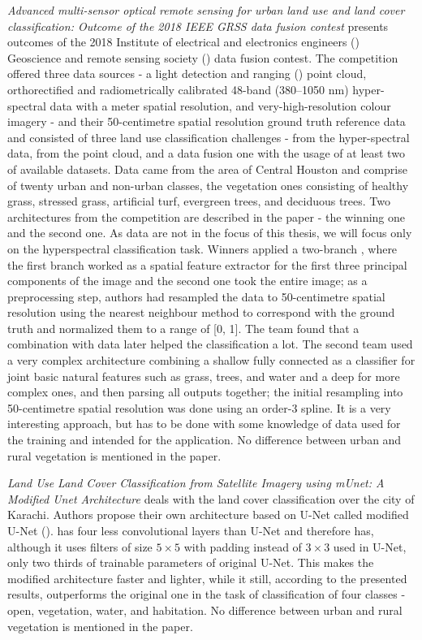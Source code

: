 \textit{Advanced multi-sensor optical remote sensing for urban land use and land cover classification: Outcome of the 2018 IEEE GRSS data fusion contest} presents outcomes of the 2018 Institute of electrical and electronics engineers () Geoscience and remote sensing society () data fusion contest. The competition offered three data sources - a light detection and ranging () point cloud, orthorectified and radiometrically calibrated 48-band (380--1050 nm) hyper-spectral data with a meter spatial resolution, and very-high-resolution colour imagery - and their 50-centimetre spatial resolution ground truth reference data and consisted of three land use classification challenges - from the hyper-spectral data, from the point cloud, and a data fusion one with the usage of at least two of available datasets. Data came from the area of Central Houston and comprise of twenty urban and non-urban classes, the vegetation ones consisting of healthy grass, stressed grass, artificial turf, evergreen trees, and deciduous trees. Two architectures from the competition are described in the paper - the winning one and the second one. As  data are not in the focus of this thesis, we will focus only on the hyperspectral classification task. Winners applied a two-branch , where the first branch worked as a spatial feature extractor for the first three principal components of the image and the second one took the entire image; as a preprocessing step, authors had resampled the data to 50-centimetre spatial resolution using the nearest neighbour method to correspond with the ground truth and normalized them to a range of [0, 1]. The team found that a combination with  data later helped the classification a lot. The second team used a very complex architecture combining a shallow fully connected  as a classifier for joint basic natural features such as grass, trees, and water and a deep  for more complex ones, and then parsing all outputs together; the initial resampling into 50-centimetre spatial resolution was done using an order-3 spline. It is a very interesting approach, but has to be done with some knowledge of data used for the training and intended for the application. No difference between urban and rural vegetation is mentioned in the paper.

\textit{Land Use Land Cover Classification from Satellite Imagery using mUnet: A Modified Unet Architecture} deals with the land cover classification over the city of Karachi. Authors propose their own architecture based on U-Net \cite{u-net} called modified U-Net ().  has four less convolutional layers than U-Net and therefore has, although it uses filters of size $5 \times 5$ with padding instead of $3 \times 3$ used in U-Net, only two thirds of trainable parameters of original U-Net. This makes the modified architecture faster and lighter, while it still, according to the presented results, outperforms the original one in the task of classification of four classes - open, vegetation, water, and habitation. No difference between urban and rural vegetation is mentioned in the paper.


